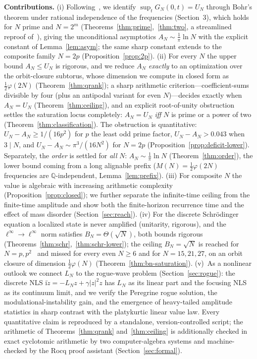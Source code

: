 \documentclass[11pt,reqno]{amsart}
\theoremstyle{plain}
\theoremstyle{definition}
\newcommand{\Q}{\mathbb{Q}}
\newcommand{\LN}{L_N}
\begin{document}
\smallskip
\noindent\textbf{Contributions.} (i) Following~\cite{F92}, we identify $\sup_t G_N(0,t)=U_N$ through Bohr's
theorem under rational independence of the frequencies (Section~3), which holds for $N$ prime and $N=2^m$
(Theorems~\ref{thm:prime},~\ref{thm:two}, a streamlined reproof of~\cite[Thm.~2]{F92}), giving the unconditional
asymptotics $A_N\sim\tfrac1\pi\ln N$ with the explicit constant of Lemma~\ref{lem:asym}; the same sharp
constant extends to the composite family $N=2p$ (Proposition~\ref{prop:2p}). (ii) For every
$N$ the upper bound $A_N\le U_N$ is rigorous, and we reduce $A_N$ \emph{exactly} to an optimization over
the orbit-closure subtorus, whose dimension we compute in closed form as $\tfrac12\varphi(2N)$
(Theorem~\ref{thm:qrank}); a sharp arithmetic criterion---coefficient-sums divisible by four (plus an antipodal variant for even
$N$)---decides exactly when $A_N=U_N$ (Theorem~\ref{thm:ceiling}), and an explicit root-of-unity
obstruction settles the saturation locus completely: $A_N=U_N$ \emph{iff} $N$ is prime or a power of two
(Theorem~\ref{thm:classification}). The obstruction is quantitative: $U_N-A_N\ge1/(16p^2)$ for $p$ the least odd
prime factor, $U_N-A_N>0.043$ when $3\mid N$, and $U_N-A_N\sim\pi^3/(16N^2)$ for $N=2p$
(Proposition~\ref{prop:deficit-lower}). Separately, the \emph{order} is settled for \emph{all} $N$:
$A_N\sim\tfrac1\pi\ln N$ (Theorem~\ref{thm:order}), the lower bound coming from a long alignable prefix
($M(N)=\tfrac12\varphi(2N)$ frequencies are $\Q$-independent, Lemma~\ref{lem:prefix}).
(iii) For composite $N$ the value is algebraic with increasing arithmetic complexity
(Proposition~\ref{prop:closed}); we further separate the infinite-time ceiling from the finite-time
amplitude and show both the finite-horizon recurrence time and the effect of mass disorder
(Section~\ref{sec:reach}). (iv) For the discrete Schr\"odinger equation a localized state is never
amplified (unitarity, rigorous), and the $\ell^\infty\!\to\!\ell^\infty$ norm satisfies
$B_N=\Theta(\sqrt N)$, both bounds rigorous (Theorems~\ref{thm:schr},~\ref{thm:schr-lower}); the ceiling
$B_N=\sqrt N$ is reached for $N=p,p^2$~\cite{GMR17,CaoZhu26} and missed for every even $N\ge6$ and for $N=15,21,27$, on an
orbit closure of dimension $\tfrac12\varphi(N)$ (Theorem~\ref{thm:bn-saturation}). (v)~As a
nonlinear outlook we connect $\LN$
to the rogue-wave problem (Section~\ref{sec:rogue}): the discrete NLS
$\mathrm i\dot z=-\LN z+\gamma|z|^2z$ has $\LN$ as its linear part and the focusing NLS as its
continuum limit, and we verify the Peregrine rogue solution, the modulational-instability gain, and
the emergence of heavy-tailed amplitude statistics in sharp contrast with the platykurtic linear value
law. Every quantitative claim is reproduced by a standalone, version-controlled script; the arithmetic of
Theorems~\ref{thm:qrank} and~\ref{thm:ceiling} is additionally checked in exact cyclotomic arithmetic by
two computer-algebra systems and machine-checked by the Rocq proof assistant (Section~\ref{sec:formal}).
\end{document}
